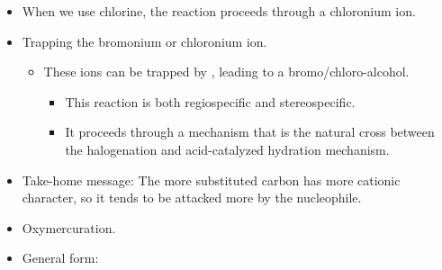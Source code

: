 \documentclass[../notes.tex]{subfiles}
\begin{document}
\begin{itemize}
\begin{figure}[h!]
\begin{subfigure}[b]{\linewidth}
                \arrow
            \schemestop
            \vspace{1em}
            \caption{Second step.}
            \label{fig:halogenationb}
        \end{subfigure}
        \caption{Halogenation mechanism.}
        \label{fig:halogenation}
    \end{figure}
    \begin{itemize}
        \item Note that in the first step, the bromonium ion will be the major contributing structure because it satisfies the octet rule and it's symmetrical. This is why we show only it in the second step.
        \item In the second step, because of the steric hindrance of the bromonium ion, the bromide ion engages in a "special attack" from the back side, resulting in the trans geometry. Note that it can attack either carbon, not just the one shown in Figure \ref{fig:halogenationb}.
    \end{itemize}
    \item When we use chlorine, the reaction proceeds through a chloronium ion.
    \item Trapping the bromonium or chloronium ion.
    \begin{itemize}
        \item These ions can be trapped by , leading to a bromo/chloro-alcohol.
        \begin{itemize}
            \item This reaction is both regiospecific and stereospecific.
            \item It proceeds through a mechanism that is the natural cross between the halogenation and acid-catalyzed hydration mechanism.
        \end{itemize}
    \end{itemize}
    \item Take-home message: The more substituted carbon has more cationic character, so it tends to be attacked more by the nucleophile.
    \item Oxymercuration.
    \item General form:

\end{itemize}
\end{document}
